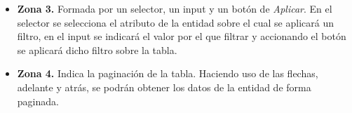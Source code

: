 \begin{itemize}
	
	\item \textbf{Zona 3. }Formada por un selector, un input y un botón de \textit{Aplicar}. En el selector se selecciona el atributo de la entidad sobre el cual se aplicará un filtro, en el input se indicará el valor por el que filtrar y accionando el botón se aplicará dicho filtro sobre la tabla.
	
	\item \textbf{Zona 4. }Indica la paginación de la tabla. Haciendo uso de las flechas, adelante y atrás, se podrán obtener los datos de la entidad de forma paginada.
\end{itemize}


